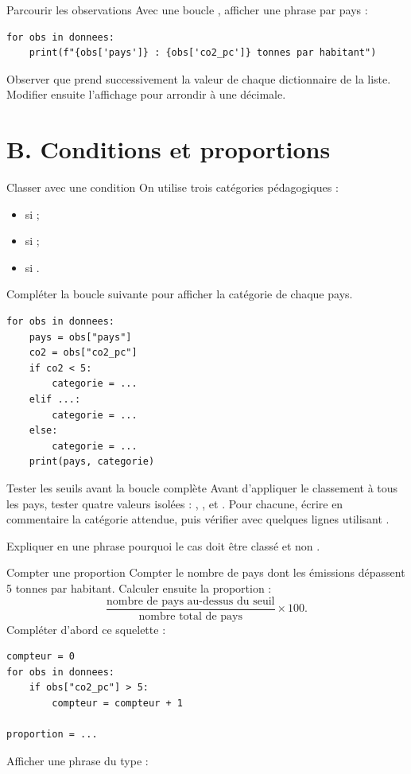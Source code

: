 \documentclass[11pt,a4paper]{article}
\begin{document}
\begin{mandatoryexercise}{Parcourir les observations}
Avec une boucle , afficher une phrase par pays :
\begin{lstlisting}
for obs in donnees:
    print(f"{obs['pays']} : {obs['co2_pc']} tonnes par habitant")
\end{lstlisting}
Observer que  prend successivement la valeur de chaque dictionnaire de la liste. Modifier ensuite l'affichage pour arrondir à une décimale.
\end{mandatoryexercise}

\section*{B. Conditions et proportions}

\begin{mandatoryexercise}{Classer avec une condition}
On utilise trois catégories pédagogiques :
\begin{itemize}
  \item {} si  ;
  \item {} si  ;
  \item {} si .
\end{itemize}
Compléter la boucle suivante pour afficher la catégorie de chaque pays.
\begin{lstlisting}
for obs in donnees:
    pays = obs["pays"]
    co2 = obs["co2_pc"]
    if co2 < 5:
        categorie = ...
    elif ...:
        categorie = ...
    else:
        categorie = ...
    print(pays, categorie)
\end{lstlisting}
\end{mandatoryexercise}

\begin{mandatoryexercise}{Tester les seuils avant la boucle complète}
Avant d'appliquer le classement à tous les pays, tester quatre valeurs isolées : , ,  et . Pour chacune, écrire en commentaire la catégorie attendue, puis vérifier avec quelques lignes utilisant .

Expliquer en une phrase pourquoi le cas  doit être classé  et non .
\end{mandatoryexercise}

\begin{mandatoryexercise}{Compter une proportion}
Compter le nombre de pays dont les émissions dépassent 5 tonnes par habitant. Calculer ensuite la proportion :
\[
\frac{\text{nombre de pays au-dessus du seuil}}{\text{nombre total de pays}} \times 100.
\]
Compléter d'abord ce squelette :
\begin{lstlisting}
compteur = 0
for obs in donnees:
    if obs["co2_pc"] > 5:
        compteur = compteur + 1

proportion = ...
\end{lstlisting}
Afficher une phrase du type : 
\end{mandatoryexercise}
\end{document}
